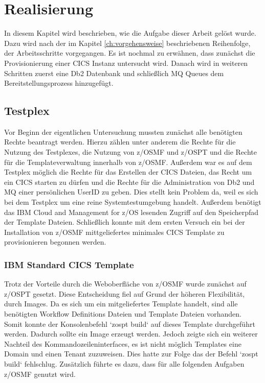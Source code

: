 \chapter{Realisierung}\label{ch:realisierung}
In diesem Kapitel wird beschrieben, wie die Aufgabe dieser Arbeit gelöst wurde.
Dazu wird nach der im Kapitel \ref{ch:vorgehensweise} beschriebenen Reihenfolge, der Arbeitsschritte vorgegangen.
Es ist nochmal zu erwähnen, dass zunächst die Provisionierung einer CICS Instanz untersucht wird.
Danach wird in weiteren Schritten zuerst eine Db2 Datenbank und schließlich MQ Queues dem Bereitstellungsprozess hinzugefügt.

\section{Testplex}
Vor Beginn der eigentlichen Untersuchung mussten zunächst alle benötigten Rechte beantragt werden.
Hierzu zählen unter anderem die Rechte für die Nutzung des Testplexes, die Nutzung von z/OSMF und z/OSPT und die Rechte für die Templateverwaltung innerhalb von z/OSMF.
Außerdem war es auf dem Testplex möglich die Rechte für das Erstellen der CICS Dateien, das Recht um ein CICS starten zu dürfen und die Rechte für die Administration von Db2 und MQ einer persönlichen UserID zu geben.
Dies stellt kein Problem da, weil es sich bei dem Testplex um eine reine Systemtestumgebung handelt.
Außerdem benötigt das IBM Cloud and Management for z/OS lesenden Zugriff auf den Speicherpfad der Template Dateien.
Schließlich konnte mit dem ersten Versuch ein bei der Installation von z/OSMF mittgeliefertes minimales CICS Template zu provisionieren begonnen werden.

\subsection{IBM Standard CICS Template}
Trotz der Vorteile durch die Weboberfläche von z/OSMF wurde zunächst auf z/OSPT gesetzt.
Diese Entscheidung fiel auf Grund der höheren Flexibilität, durch Images.
Da es sich um ein mitgeliefertes Template handelt, sind alle benötigten Workflow Definitions Dateien und Template Dateien vorhanden.
Somit konnte der Konsolenbefehl `zospt build` auf dieses Template durchgeführt werden.
Dadurch sollte ein Image erzeugt werden.
Jedoch zeigte sich ein weiterer Nachteil des Kommandozeileninterfaces, es ist nicht möglich Templates eine Domain und einen Tenant zuzuweisen.
Dies hatte zur Folge das der Befehl `zospt build` fehlschlug.
Zusätzlich führte es dazu, dass für alle folgenden Aufgaben z/OSMF genutzt wird.

